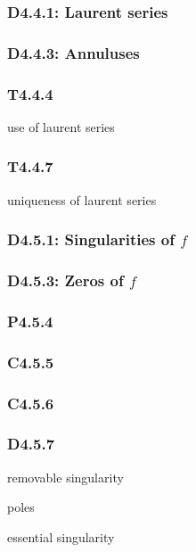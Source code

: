 \documentclass{article}
\begin{document}
\begin{multicols*}{3}
\newcolumn

\subsubsection*{D4.4.1: Laurent series}

\subsubsection*{D4.4.3: Annuluses}

\subsubsection*{T4.4.4}
use of laurent series

\subsubsection*{T4.4.7}
uniqueness of laurent series

\newcolumn

\subsubsection*{D4.5.1: Singularities of $f$}

\subsubsection*{D4.5.3: Zeros of $f$}

\subsubsection*{P4.5.4}

\subsubsection*{C4.5.5}

\subsubsection*{C4.5.6}

\subsubsection*{D4.5.7}
removable singularity

poles

essential singularity


\end{multicols*}
\end{document}
